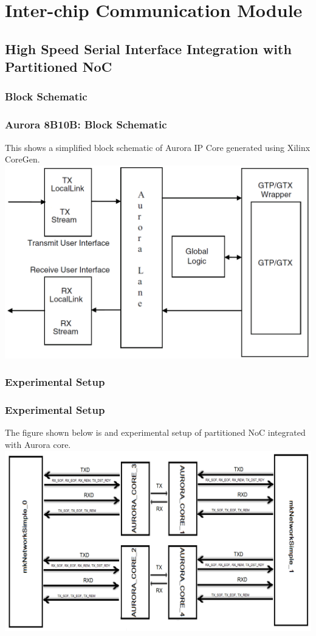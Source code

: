 \section{Inter-chip Communication Module}
\subsection{High Speed Serial Interface Integration with Partitioned NoC}
\subsubsection{Block Schematic}
\begin{frame}
\frametitle{Aurora 8B10B: Block Schematic}
This shows a simplified block schematic of Aurora IP Core generated using Xilinx CoreGen.\\
	\centering
	\includegraphics[scale=0.2]{./figs/auroraTop}
\end{frame}

\subsubsection{Experimental Setup}
\begin{frame}
\frametitle{Experimental Setup}
The figure shown below is and experimental setup of partitioned NoC integrated with Aurora core.\\
	\centering
	\includegraphics[scale=0.2]{./figs/PartitioningArchitecture}
\end{frame}

